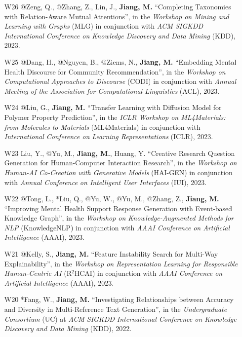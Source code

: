 \documentclass[10pt]{article}
\newenvironment{myindentpar}[1]%
{\begin{list}{}%
         {\setlength{\leftmargin}{#1}}%
         \item[]%
}
{\end{list}}
\newcounter{list}
\begin{document}
\begin{myindentpar}{0.00cm}
\begin{enumerate}[leftmargin=.5cm]
\item[W26] @Zeng, Q., @Zhang, Z., Lin, J., \textbf{Jiang, M.} ``Completing Taxonomies with Relation-Aware Mutual Attentions'', in the \textit{Workshop on Mining and Learning with Graphs} (MLG) in conjunction with \textit{ACM SIGKDD International Conference on Knowledge Discovery and Data Mining} (KDD), 2023.

\item[W25] @Dang, H., @Nguyen, B., @Ziems, N., \textbf{Jiang, M.} ``Embedding Mental Health Discourse for Community Recommendation'', in the \textit{Workshop on Computational Approaches to Discourse} (CODI) in conjunction with \textit{Annual Meeting of the Association for Computational Linguistics} (ACL), 2023.

\item[W24] @Liu, G., \textbf{Jiang, M.} ``Transfer Learning with Diffusion Model for Polymer Property Prediction'', in the \textit{ICLR Workshop on ML4Materials: from Molecules to Materials} (ML4Materials) in conjunction with \textit{International Conference on Learning Representations} (ICLR), 2023.

\item[W23] Liu, Y., @Yu, M., \textbf{Jiang, M.}, Huang, Y. ``Creative Research Question Generation for Human-Computer Interaction Research'', in the \textit{Workshop on Human-AI Co-Creation with Generative Models} (HAI-GEN) in conjunction with \textit{Annual Conference on Intelligent User Interfaces} (IUI), 2023.

\item[W22] @Tong, L., *Liu, Q., @Yu, W., @Yu, M., @Zhang, Z., \textbf{Jiang, M.} ``Improving Mental Health Support Response Generation with Event-based Knowledge Graph'', in the \textit{Workshop on Knowledge-Augmented Methods for NLP} (KnowledgeNLP) in conjunction with \textit{AAAI Conference on Artificial Intelligence} (AAAI), 2023.

\item[W21] @Kelly, S., \textbf{Jiang, M.} ``Feature Instability Search for Multi-Way Explainability'', in the \textit{Workshop on Representation Learning for Responsible Human-Centric AI} (R$^2$HCAI) in conjunction with \textit{AAAI Conference on Artificial Intelligence} (AAAI), 2023.

\item[W20] *Fang, W., \textbf{Jiang, M.} ``Investigating Relationships between Accuracy and Diversity in Multi-Reference Text Generation'', in the \textit{Undergraduate Consortium} (UC) at \textit{ACM SIGKDD International Conference on Knowledge Discovery and Data Mining} (KDD), 2022.


\end{enumerate}
\end{myindentpar}
\end{document}
